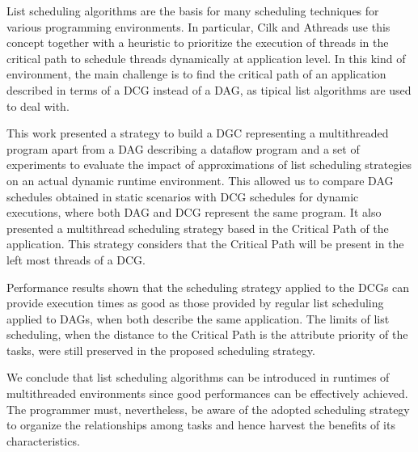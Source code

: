 \documentclass[twocolumn]{svjour3}
\begin{document}
List scheduling algorithms are the basis for many scheduling techniques for various programming environments. In particular, Cilk and Athreads use this concept together with a heuristic to prioritize the execution of threads in the critical path to schedule threads dynamically at application level. In this kind of environment, the main challenge is to find the critical path of an application described in terms of a DCG instead of a DAG, as tipical list algorithms are used to deal with.

This work presented a strategy to build a DGC representing a multithreaded program apart from a DAG describing a dataflow program and a set of experiments to evaluate the impact of approximations of list scheduling strategies on an actual dynamic runtime environment. This allowed us to compare DAG schedules obtained in static scenarios with DCG schedules for dynamic executions, where both DAG and DCG represent the same program. It also presented a multithread scheduling strategy based in the Critical Path of the application. This strategy considers that the Critical Path will be present in the left most threads of a DCG. 

Performance results shown that the scheduling strategy applied to the DCGs can provide execution times as good as those provided by regular list scheduling applied to DAGs, when both describe the same application. The limits of list scheduling, when the distance to the Critical Path is the attribute priority of the tasks, were still preserved in the proposed scheduling strategy.

We conclude that list scheduling algorithms can be introduced in runtimes of multithreaded environments since good performances can be effectively achieved. The programmer must, nevertheless, be aware of the adopted scheduling strategy to organize the relationships among tasks and hence harvest the benefits of its characteristics.



\end{document}

